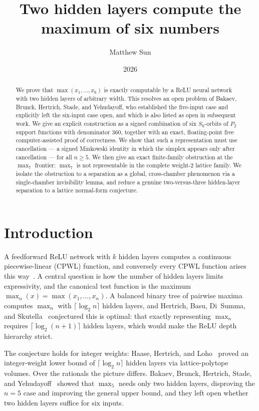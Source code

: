 \documentclass[11pt]{article}
\title{Two hidden layers compute the maximum of six numbers}
\author{Matthew Sun}
\date{2026}
\theoremstyle{definition}
\begin{document}
\maketitle

\begin{abstract}
We prove that $\max(x_1,\dots,x_6)$ is exactly computable by a ReLU neural network with two hidden
layers of arbitrary width. This resolves an open problem of Bakaev, Brunck, Hertrich, Stade, and
Yehudayoff, who established the five-input case and explicitly left the six-input case open, and which is
also listed as open in subsequent work. We give an explicit construction as a signed combination of six
$S_6$-orbits of $P_2$ support functions with denominator $360$, together with an exact, floating-point
free computer-assisted proof of correctness. We show that such a representation must use cancellation --- a
signed Minkowski identity in which the simplex appears only after cancellation --- for all $n\ge 5$. We then
give an exact finite-family obstruction at the $\max_7$ frontier: $\max_7$ is not representable in the
complete weight-2 lattice family. We isolate the obstruction to a separation as a global, cross-chamber
phenomenon via a single-chamber invisibility lemma, and reduce a genuine two-versus-three hidden-layer
separation to a lattice normal-form conjecture.
\end{abstract}

\section{Introduction}

A feedforward ReLU network with $k$ hidden layers computes a continuous piecewise-linear (CPWL) function,
and conversely every CPWL function arises this way~\cite{ABMM}. A central question is how the number of
hidden layers limits expressivity, and the canonical test function is the maximum
$\max_n(x)=\max(x_1,\dots,x_n)$. A balanced binary tree of pairwise maxima computes $\max_n$ with
$\lceil\log_2 n\rceil$ hidden layers, and Hertrich, Basu, Di~Summa, and Skutella~\cite{HBDS} conjectured
this is optimal: that exactly representing $\max_n$ requires $\lceil\log_2(n+1)\rceil$ hidden layers, which
would make the ReLU depth hierarchy strict.

The conjecture holds for integer weights: Haase, Hertrich, and Loho~\cite{HHL} proved an integer-weight
lower bound of $\lceil\log_2 n\rceil$ hidden layers via lattice-polytope volumes. Over the rationals the
picture differs. Bakaev, Brunck, Hertrich, Stade, and Yehudayoff~\cite{BBHSY} showed that $\max_5$ needs
only two hidden layers, disproving the $n=5$ case and improving the general upper bound, and they left
open whether two hidden layers suffice for six inputs.
\end{document}
